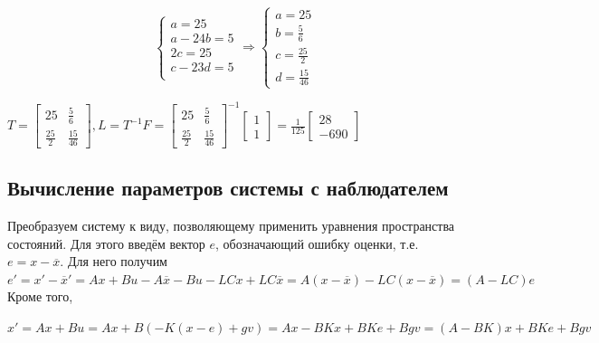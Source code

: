 \documentclass[14pt,a4paper,report]{report}
\begin{document}
\begin{equation*}
	\begin{cases}
		\text{$a=25$} \\
		\text{$a-24b=5$} \\
		\text{$2c=25$} \\
		\text{$c-23d=5$} \\
	\end{cases}
	\Longrightarrow
	\begin{cases}
		\text{$a=25$} \\
		\text{$b=\frac{5}{6}$} \\
		\text{$c=\frac{25}{2}$} \\
		\text{$d=\frac{15}{46}$} 
	\end{cases}
\end{equation*}

\begin{center}
	$T=\begin{bmatrix} 25 & \frac{5}{6} \\ \frac{25}{2} & \frac{15}{46} \end{bmatrix}, L=T^{-1}F=\begin{bmatrix} 25 & \frac{5}{6} \\ \frac{25}{2} & \frac{15}{46} \end{bmatrix}^{-1}\begin{bmatrix} 1 \\ 1 \end{bmatrix}=\frac{1}{125}\begin{bmatrix} 28 \\ -690 \end{bmatrix}$
\end{center}

\subsection{Вычисление параметров системы с наблюдателем}

Преобразуем систему к виду, позволяющему применить уравнения пространства состояний. Для этого введём вектор $e$, обозначающий ошибку оценки, т.е. $e=x-\overline{x}$. Для него получим\\

$e'=x'-\overline{x}'=Ax+Bu-A\overline{x}-Bu-LCx+LC\overline{x}=A(x-\overline{x})-LC(x-\overline{x})=(A-LC)e$\\

Кроме того,

$x'=Ax+Bu=Ax+B(-K(x-e)+gv)=Ax-BKx+BKe+Bgv=(A-BK)x+BKe+Bgv$\\
\end{document}
